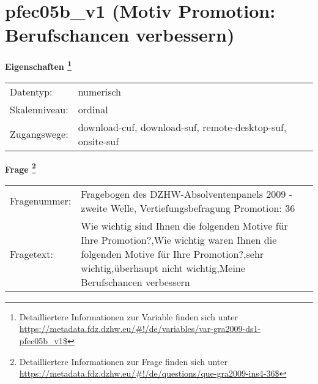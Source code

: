 
    \setcounter{footnote}{0}

    \vspace*{-1.8cm}
	\section{pfec05b\_v1 (Motiv Promotion: Berufschancen verbessern)}
	\label{section:pfec05b_v1}



    \vspace*{0.5cm}
    \noindent\textbf{Eigenschaften
	\footnote{Detailliertere Informationen zur Variable finden sich unter
		\url{https://metadata.fdz.dzhw.eu/\#!/de/variables/var-gra2009-ds1-pfec05b_v1$}}}\\
	\begin{tabularx}{\hsize}{@{}lX}
	Datentyp: & numerisch \\
	Skalenniveau: & ordinal \\
	Zugangswege: &
	  download-cuf, 
	  download-suf, 
	  remote-desktop-suf, 
	  onsite-suf
 \\
    \end{tabularx}



				\vspace*{0.5cm}
                \noindent\textbf{Frage
	                \footnote{Detailliertere Informationen zur Frage finden sich unter
		              \url{https://metadata.fdz.dzhw.eu/\#!/de/questions/que-gra2009-ins4-36$}}}\\
				\begin{tabularx}{\hsize}{@{}lX}
					Fragenummer: &
					  Fragebogen des DZHW-Absolventenpanels 2009 - zweite Welle, Vertiefungsbefragung Promotion:
					  36
 \\
					Fragetext: & Wie wichtig sind Ihnen die folgenden Motive für Ihre Promotion?,Wie wichtig waren Ihnen die folgenden Motive für Ihre Promotion?,sehr wichtig,überhaupt nicht wichtig,Meine Berufschancen verbessern \\
				\end{tabularx}





